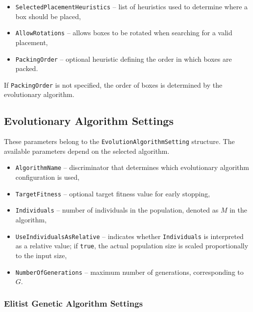 \begin{itemize}
    \item \texttt{SelectedPlacementHeuristics} -- list of heuristics used to determine where a box should be placed,
    
    \item \texttt{AllowRotations} -- allows boxes to be rotated when searching for a valid placement,
    
    \item \texttt{PackingOrder} -- optional heuristic defining the order in which boxes are packed.
\end{itemize}

If \texttt{PackingOrder} is not specified, the order of boxes is determined by the evolutionary algorithm.

\subsection{Evolutionary Algorithm Settings}

These parameters belong to the \texttt{EvolutionAlgorithmSetting} structure.
The available parameters depend on the selected algorithm.

\begin{itemize}
    \item \texttt{AlgorithmName} -- discriminator that determines which evolutionary algorithm configuration is used,

    \item \texttt{TargetFitness} -- optional target fitness value for early stopping,
    
    \item \texttt{Individuals} -- number of individuals in the population, denoted as $M$ in the algorithm,

    \item \texttt{UseIndividualsAsRelative} -- indicates whether \texttt{Individuals} is interpreted as a relative value; if \texttt{true}, the actual population size is scaled proportionally to the input size,

    \item \texttt{NumberOfGenerations} -- maximum number of generations, corresponding to $G$.
\end{itemize}

\subsubsection{Elitist Genetic Algorithm Settings}

